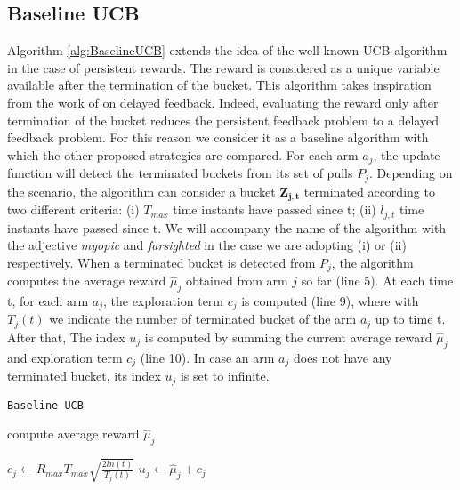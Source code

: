 \subsection{Baseline UCB}

Algorithm \ref{alg:BaselineUCB} extends the idea of the well known UCB algorithm in the case of persistent rewards. The reward is considered as a unique variable available after the termination of the bucket. This algorithm takes inspiration from the work of \cite{joulani2013} on delayed feedback. Indeed, evaluating the reward only after termination of the bucket reduces the persistent feedback problem to a delayed feedback problem. For this reason we consider it as a baseline algorithm with which the other proposed strategies are compared. For each arm $a_j$, the update function will detect the terminated buckets from its set of pulls $P_j$. Depending on the scenario, the algorithm can consider a bucket $\boldsymbol{Z_{j,t}}$ terminated according to two different criteria: (i) $T_{max}$ time instants have passed since t; (ii) $l_{j,t}$ time instants have passed since t. We will accompany the name of the algorithm with the adjective \emph{myopic} and \emph{farsighted} in the case we are adopting (i) or (ii) respectively. When a terminated bucket is detected from $P_j$,
the algorithm computes the average reward $\hat{\mu}_j $ obtained from arm $j$ so far (line 5). At each time t, for each arm $a_j$, the exploration term $c_j$ is computed (line 9), where with ${T_j(t)}$ we indicate the number of terminated bucket of the arm $a_j$ up to time t. After that, The index $u_j$ is computed by summing the current average reward $\hat{\mu}_j $ and exploration term $c_j$ (line 10). In case an arm $a_j$ does not have any terminated bucket, its index $u_j$ is set to infinite. %

\begin{algorithm}[!h]
	\caption{\texttt{Baseline UCB}}
	\begin{scriptsize}
		\begin{algorithmic}[1]
			
			
			\State compute average reward $\hat{\mu}_j $\;
			
			\EndIf				
			\EndFor			
			
			\State$c_j\gets R_{max}  T_{max}  \sqrt{\frac{2ln(t)}{T_j(t)}}$\;
			\State$u_j \gets  \hat{\mu}_j +  c_j$
			\EndFor
			
			\EndFunction
			
		\end{algorithmic}
	\end{scriptsize}
	\label{alg:BaselineUCB}
\end{algorithm}

